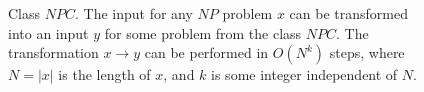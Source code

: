 \begin{figure}
\centering



\caption{Class $NPC$. The input for any $NP$ problem $x$ can be
  transformed into an input $y$ for some problem from the
  class $NPC$. The transformation $x \rightarrow y$ can be performed in
  $O\left(N^k\right)$ steps, where $N = \left|x\right|$ is the length of $x$, and $k$
  is some integer independent of $N$.
} 
\label{figAddAlgoNPC}
\end{figure}
